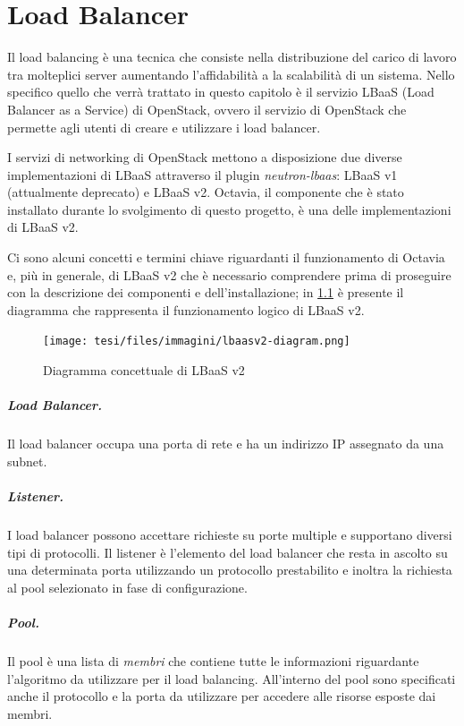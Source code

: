 \chapter{Load Balancer}

Il load balancing è una tecnica che consiste nella distribuzione del carico di lavoro tra molteplici server aumentando l'affidabilità a la scalabilità di un sistema. Nello specifico quello che verrà trattato in questo capitolo è il servizio LBaaS (Load Balancer as a Service) di OpenStack, ovvero il servizio di OpenStack che permette agli utenti di creare e utilizzare i load balancer.

I servizi di networking di OpenStack mettono a disposizione due diverse implementazioni di LBaaS attraverso il plugin \textit{neutron-lbaas}: LBaaS v1 (attualmente deprecato) e LBaaS v2. Octavia, il componente che è stato installato durante lo svolgimento di questo progetto, è una delle implementazioni di LBaaS v2.

Ci sono alcuni concetti e termini chiave riguardanti il funzionamento di Octavia e, più in generale, di LBaaS v2 che è necessario comprendere prima di proseguire con la descrizione dei componenti e dell'installazione; in \cref{fig:lbaas_schema} è presente il diagramma che rappresenta il funzionamento logico di LBaaS v2.

\begin{figure}[H]
    \center
    \texttt{[image: tesi/files/immagini/lbaasv2-diagram.png]}
    \caption{Diagramma concettuale di LBaaS v2 \cite{lbaas_docs}}
    \label{fig:lbaas_schema}
\end{figure}

\paragraph{Load Balancer.} Il load balancer occupa una porta di rete e ha un indirizzo IP assegnato da una subnet.

\paragraph{Listener.} I load balancer possono accettare richieste su porte multiple e supportano diversi tipi di protocolli. Il listener è l'elemento del load balancer che resta in ascolto su una determinata porta utilizzando un protocollo prestabilito e inoltra la richiesta al pool selezionato in fase di configurazione.

\paragraph{Pool.} Il pool è una lista di \emph{membri} che contiene tutte le informazioni riguardante l'algoritmo da utilizzare per il load balancing. All'interno del pool sono specificati anche il protocollo e la porta da utilizzare per accedere alle risorse esposte dai membri.

